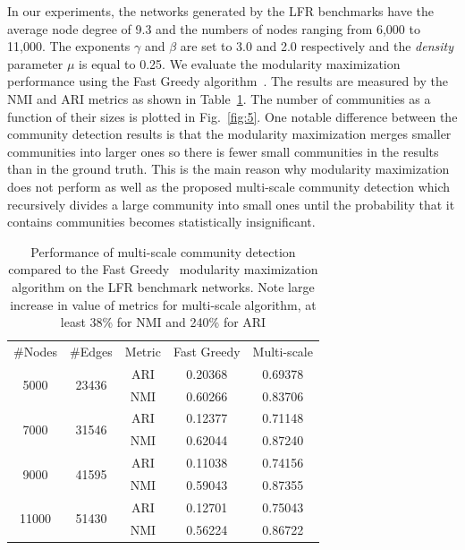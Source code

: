 In our experiments, the networks generated by the LFR benchmarks have the average node degree of 9.3 and the numbers of nodes ranging from 6,000 to 11,000. The exponents $\gamma$ and $\beta$ are set to 3.0 and 2.0 respectively and the {\it density} parameter $\mu$ is equal to 0.25. We evaluate the modularity maximization performance using the Fast Greedy algorithm~\cite{clauset2004finding}. The results are measured by the NMI and ARI metrics as shown in Table~\ref{tab:1}. The number of communities as a function of their sizes is plotted in Fig.~\ref{fig:5}. One notable difference between the community detection results is that the modularity maximization merges smaller communities into larger ones so there is fewer small communities in the results than in the ground truth. This is the main reason why modularity maximization does not perform as well as the proposed multi-scale community detection which recursively divides a large community into small ones until the probability that it contains communities becomes statistically insignificant.

\begin{table}[]
\centering
\caption{Performance of multi-scale community detection compared to the Fast Greedy~\cite{clauset2004finding} modularity maximization algorithm on the LFR benchmark networks. Note large increase in value of metrics for multi-scale algorithm, at least 38\% for NMI and 240\% for ARI}
\label{tab:1}
\begin{tabular}{ccccc}
\hline
\multirow{2}{*}{\#Nodes} & \multirow{2}{*}{\#Edges} & \multirow{2}{*}{Metric} & \multirow{2}{*}{Fast Greedy} & \multirow{2}{*}{Multi-scale} \\
                  &                   &                  &            &                           \\
\hline

\multirow{2}{*}{5000} & \multirow{2}{*}{23436} & ARI     &  0.20368   &  0.69378                \\
                  &                   &          NMI     &  0.60266   &  0.83706                         \\
\multirow{2}{*}{7000} & \multirow{2}{*}{31546} & ARI     &  0.12377   &  0.71148                \\
                  &                   &          NMI     &  0.62044   &  0.87240                         \\
\multirow{2}{*}{9000} & \multirow{2}{*}{41595} & ARI     &  0.11038   &  0.74156               \\
&                   &          NMI     &  0.59043   &  0.87355                        \\
\multirow{2}{*}{11000} & \multirow{2}{*}{51430} & ARI     &  0.12701   &  0.75043               \\
&                   &          NMI     &  0.56224   &  0.86722              \\          
\hline
\end{tabular}
\end{table}

